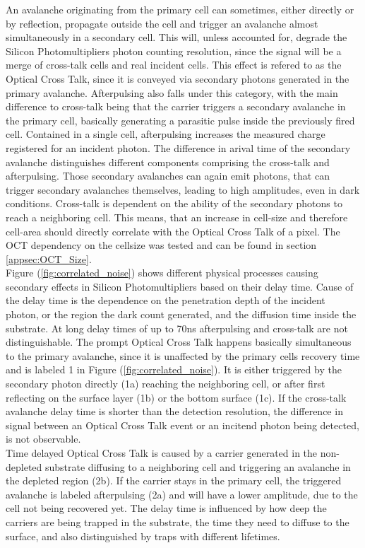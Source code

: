 \documentclass[12pt,article,type=msc,colorback,accentcolor=tud9c]{tudthesis}
\begin{document}
An avalanche originating from the primary cell can sometimes, either directly or by reflection, propagate outside the cell and trigger an avalanche almost simultaneously in a secondary cell. This will, unless accounted for, degrade the Silicon Photomultipliers photon counting resolution, since the signal will be a merge of cross-talk cells and real incident cells. This effect is refered to as the Optical Cross Talk, since it is conveyed via secondary photons generated in the primary avalanche. Afterpulsing also falls under this category, with the main difference to cross-talk being that the carrier triggers a secondary avalanche in the primary cell, basically generating a parasitic pulse inside the previously fired cell. Contained in a single cell, afterpulsing increases the measured charge registered for an incident photon. The difference in arival time of the secondary avalanche distinguishes different components comprising the cross-talk and afterpulsing. Those secondary avalanches can again emit photons, that can trigger secondary avalanches themselves, leading to high amplitudes, even in dark conditions. Cross-talk is dependent on the ability of the secondary photons to reach a neighboring cell. This means, that an increase in cell-size and therefore cell-area should directly correlate with the Optical Cross Talk of a pixel. The OCT dependency on the cellsize was tested and can be found in section {\ref{appsec:OCT_Size}}.\\
Figure (\ref{fig:correlated_noise}) shows different physical processes causing secondary effects in Silicon Photomultipliers based on their delay time. Cause of the delay time is the dependence on the penetration depth of the incident photon, or the region the dark count generated, and the diffusion time inside the substrate. At long delay times of up to 70ns afterpulsing and cross-talk are not distinguishable.\cite{ModelCTAP} The prompt Optical Cross Talk happens basically simultaneous to the primary avalanche, since it is unaffected by the primary cells recovery time and is labeled 1 in Figure (\ref{fig:correlated_noise}). It is either triggered by the secondary photon directly (1a) reaching the neighboring cell, or after first reflecting on the surface layer (1b) or the bottom surface (1c). If the cross-talk avalanche delay time is shorter than the detection resolution, the difference in signal between an Optical Cross Talk event or an incitend photon being detected, is not observable.\\
Time delayed Optical Cross Talk is caused by a carrier generated in the non-depleted substrate diffusing to a neighboring cell and triggering an avalanche in the depleted region (2b). If the carrier stays in the primary cell, the triggered avalanche is labeled afterpulsing (2a) and will have a lower amplitude, due to the cell not being recovered yet. The delay time is influenced by how deep the carriers are being trapped in the substrate, the time they need to diffuse to the surface, and also distinguished by traps with different lifetimes.\\
\end{document}
